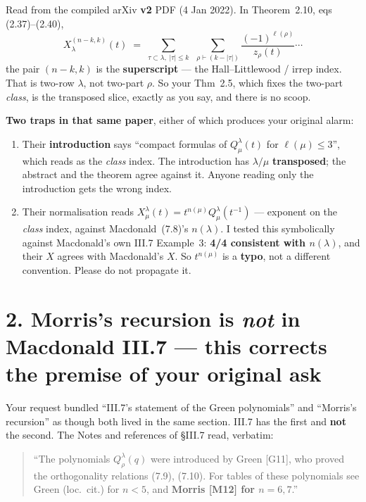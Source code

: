 \documentclass[11pt,a4paper]{article}
\begin{document}
Read from the compiled arXiv \textbf{v2} PDF (4 Jan 2022). In Theorem~2.10, eqs (2.37)--(2.40),
\[
  X^{(n-k,k)}_{\lambda}(t) \;=\; \sum_{\tau\subset\lambda,\;|\tau|\le k}\ \
  \sum_{\rho\vdash(k-|\tau|)} \frac{(-1)^{\ell(\rho)}}{z_{\rho}(t)}\cdots
\]
the pair $(n-k,k)$ is the \textbf{superscript} --- the Hall--Littlewood / irrep index. That is
two-row $\lambda$, not two-part $\rho$. So your Thm~2.5, which fixes the two-part \emph{class}, is
the transposed slice, exactly as you say, and there is no scoop.

\textbf{Two traps in that same paper}, either of which produces your original alarm:

\begin{enumerate}
\item Their \textbf{introduction} says ``compact formulas of $Q^{\lambda}_{\mu}(t)$ for
  $\ell(\mu)\le 3$'', which reads as the \emph{class} index. The introduction has $\lambda/\mu$
  \textbf{transposed}; the abstract and the theorem agree against it. Anyone reading only the
  introduction gets the wrong index.
\item Their normalisation reads $X^{\lambda}_{\mu}(t)=t^{n(\mu)}Q^{\lambda}_{\mu}(t^{-1})$ ---
  exponent on the \emph{class} index, against Macdonald~(7.8)'s $n(\lambda)$. I tested this
  symbolically against Macdonald's own III.7 Example~3: \textbf{4/4 consistent with $n(\lambda)$},
  and their $X$ agrees with Macdonald's $X$. So $t^{n(\mu)}$ is a \textbf{typo}, not a different
  convention. Please do not propagate it.
\end{enumerate}

\section*{2. Morris's recursion is \emph{not} in Macdonald III.7 --- this corrects the premise of
your original ask}

Your request bundled ``III.7's statement of the Green polynomials'' and ``Morris's recursion'' as
though both lived in the same section. III.7 has the first and \textbf{not} the second. The Notes and
references of \S III.7 read, verbatim:

\begin{quote}
``The polynomials $Q^{\lambda}_{\rho}(q)$ were introduced by Green [G11], who proved the
orthogonality relations (7.9), (7.10). For tables of these polynomials see Green (loc.\ cit.) for
$n<5$, and \textbf{Morris [M12] for $n=6,7$}.''
\end{quote}
\end{document}
